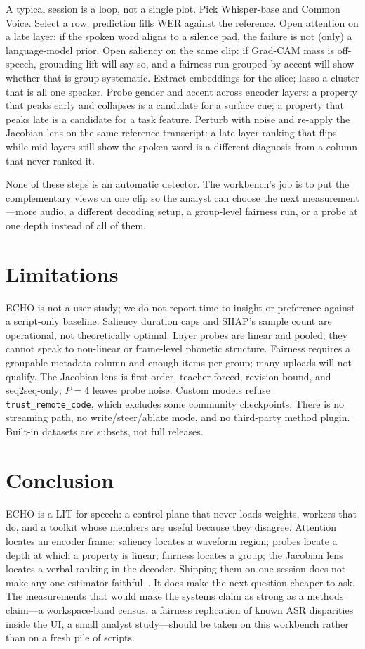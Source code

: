 \documentclass[conference]{IEEEtran}
\begin{document}
A typical session is a loop, not a single plot. Pick Whisper-base and Common Voice. Select a row; prediction fills WER against the reference. Open attention on a late layer: if the spoken word aligns to a silence pad, the failure is not (only) a language-model prior. Open saliency on the same clip: if Grad-CAM mass is off-speech, grounding lift will say so, and a fairness run grouped by accent will show whether that is group-systematic. Extract embeddings for the slice; lasso a cluster that is all one speaker. Probe gender and accent across encoder layers: a property that peaks early and collapses is a candidate for a surface cue; a property that peaks late is a candidate for a task feature. Perturb with noise and re-apply the Jacobian lens on the same reference transcript: a late-layer ranking that flips while mid layers still show the spoken word is a different diagnosis from a column that never ranked it.

None of these steps is an automatic detector. The workbench's job is to put the complementary views on one clip so the analyst can choose the next measurement---more audio, a different decoding setup, a group-level fairness run, or a probe at one depth instead of all of them.

\section{Limitations}

ECHO is not a user study; we do not report time-to-insight or preference against a script-only baseline. Saliency duration caps and SHAP's sample count are operational, not theoretically optimal. Layer probes are linear and pooled; they cannot speak to non-linear or frame-level phonetic structure. Fairness requires a groupable metadata column and enough items per group; many uploads will not qualify. The Jacobian lens is first-order, teacher-forced, revision-bound, and seq2seq-only; $P=4$ leaves probe noise. Custom models refuse \texttt{trust\_remote\_code}, which excludes some community checkpoints. There is no streaming path, no write/steer/ablate mode, and no third-party method plugin. Built-in datasets are subsets, not full releases.

\section{Conclusion}

ECHO is a LIT for speech: a control plane that never loads weights, workers that do, and a toolkit whose members are useful because they disagree. Attention locates an encoder frame; saliency locates a waveform region; probes locate a depth at which a property is linear; fairness locates a group; the Jacobian lens locates a verbal ranking in the decoder. Shipping them on one session does not make any one estimator faithful~\cite{jacovi2020faithfulness}. It does make the next question cheaper to ask. The measurements that would make the systems claim as strong as a methods claim---a workspace-band census, a fairness replication of known ASR disparities inside the UI, a small analyst study---should be taken on this workbench rather than on a fresh pile of scripts.
\end{document}
